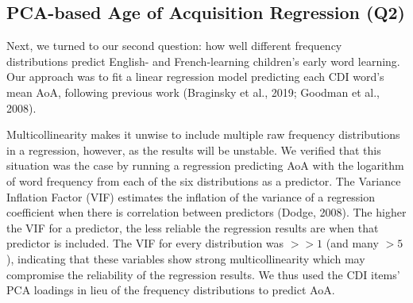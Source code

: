 \documentclass[10pt, letterpaper]{article}
\newenvironment{CodeChunk}{}{}
\begin{document}
\begin{CodeChunk}
\begin{table}
\begin{tabular}[t]{>{}l>{}r>{}r>{}r>{}r>{}r>{}r}
\cellcolor{white}{\textcolor{black}{PVar}} & \cellcolor{white}{\textcolor{black}{0.90}} & \cellcolor{white}{\textcolor{black}{0.04}} & \cellcolor{white}{\textcolor{black}{0.03}} & \cellcolor{white}{\textcolor{black}{0.02}} & \cellcolor{white}{\textcolor{black}{0.01}} & \cellcolor{white}{\textcolor{black}{0.00}}\\
\bottomrule
\end{tabular}
\end{table}

\end{CodeChunk}

\hypertarget{pca-based-age-of-acquisition-regression-q2}{%
\subsection{PCA-based Age of Acquisition Regression
(Q2)}\label{pca-based-age-of-acquisition-regression-q2}}

Next, we turned to our second question: how well different frequency
distributions predict English- and French-learning children's early word
learning. Our approach was to fit a linear regression model predicting
each CDI word's mean AoA, following previous work (Braginsky et al.,
2019; Goodman et al., 2008).

Multicollinearity makes it unwise to include multiple raw frequency
distributions in a regression, however, as the results will be unstable.
We verified that this situation was the case by running a regression
predicting AoA with the logarithm of word frequency from each of the six
distributions as a predictor. The Variance Inflation Factor (VIF)
estimates the inflation of the variance of a regression coefficient when
there is correlation between predictors (Dodge, 2008). The higher the
VIF for a predictor, the less reliable the regression results are when
that predictor is included. The VIF for every distribution was \(>>1\)
(and many \(>5\)), indicating that these variables show strong
multicollinearity which may compromise the reliability of the regression
results. We thus used the CDI items' PCA loadings in lieu of the
frequency distributions to predict AoA.
\end{document}
